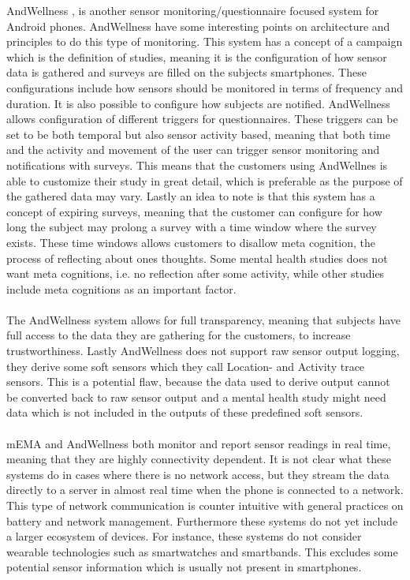 AndWellness \parencite{hicks2010andwellness}, is another sensor monitoring/questionnaire focused system for Android phones. AndWellness have some interesting points on architecture and principles to do this type of monitoring. This system has a concept of a campaign which is the definition of studies, meaning it is the configuration of how sensor data is gathered and surveys are filled on the subjects smartphones. These configurations include how sensors should be monitored in terms of frequency and duration. It is also possible to configure how subjects are notified. AndWellness allows configuration of different triggers for questionnaires. These triggers can be set to be both temporal but also sensor activity based, meaning that both time and the activity and movement of the user can trigger sensor monitoring and notifications with surveys. This means that the customers using AndWellnes is able to customize their study in great detail, which is preferable as the purpose of the gathered data may vary. Lastly an idea to note is that this system has a concept of expiring surveys, meaning that the customer can configure for how long the subject may prolong a survey with a time window where the survey exists. These time windows allows customers to disallow meta cognition, the process of reflecting about ones thoughts. Some mental health studies does not want meta cognitions, i.e. no reflection after some activity, while other studies include meta cognitions as an important factor. 
\\\\
The AndWellness system allows for full transparency, meaning that subjects have full access to the data they are gathering for the customers, to increase trustworthiness. Lastly AndWellness does not support raw sensor output logging, they derive some soft sensors which they call Location- and Activity trace sensors. This is a potential flaw, because the data used to derive output cannot be converted back to raw sensor output and a mental health study might need data which is not included in the outputs of these predefined soft sensors.
\\\\
mEMA and AndWellness both monitor and report sensor readings in real time, meaning that they are highly connectivity dependent. It is not clear what these systems do in cases where there is no network access, but they stream the data directly to a server in almost real time when the phone is connected to a network. This type of network communication is counter intuitive with general practices on battery and network management. Furthermore these systems do not yet include a larger ecosystem of devices. For instance, these systems do not consider wearable technologies such as smartwatches and smartbands. This excludes some potential sensor information which is usually not present in smartphones.

